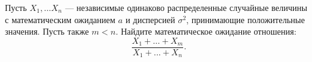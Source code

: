\documentclass{article}
\begin{document}
Пусть $X_1, \ldots X_n$ --- независимые одинаково распределенные случайные величины с
математическим ожиданием $a$ и дисперсией $\sigma^2$, принимающие положительные значения. Пусть также 
$m < n$. Найдите математическое ожидание отношения:
$$\frac{X_1 + \ldots + X_m}{X_1 + \ldots + X_n}.$$
\end{document}
